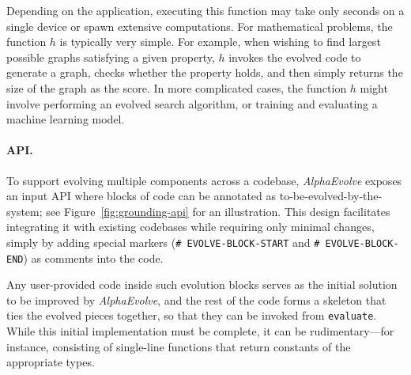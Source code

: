 \documentclass[logo,copyright,12pt]{googledeepmind}
\theoremstyle{definition}
\theoremstyle{remark}
\theoremstyle{plain}
\newcommand{\method}{\emph{AlphaEvolve}\xspace}
\begin{document}
Depending on the application, executing this function may take only seconds on a single device or spawn extensive computations. For mathematical problems, the function $h$ is typically very simple.
For example, when wishing to find largest possible graphs satisfying a given property, $h$ invokes the evolved code to generate a graph, checks whether the property holds, and then simply returns the size of the graph as the score.
In more complicated cases, the function $h$ might involve performing an evolved search algorithm, or training and evaluating a machine learning model.

\paragraph{API.} To support evolving multiple components across a codebase, \method exposes an input API where blocks of code can be annotated as to-be-evolved-by-the-system; see Figure~\ref{fig:grounding-api} for an illustration. This design facilitates integrating it with existing codebases while requiring only minimal changes, simply by adding special markers (\texttt{\# EVOLVE-BLOCK-START} and \texttt{\# EVOLVE-BLOCK-END}) as comments into the code.

Any user-provided code inside such evolution blocks serves as the initial solution to be improved by \method, and the rest of the code forms a skeleton that ties the evolved pieces together, so that they can be invoked from \texttt{evaluate}. 
While this initial implementation must be complete, it can be rudimentary---for instance, consisting of single-line functions that return constants of the appropriate types.
\end{document}

